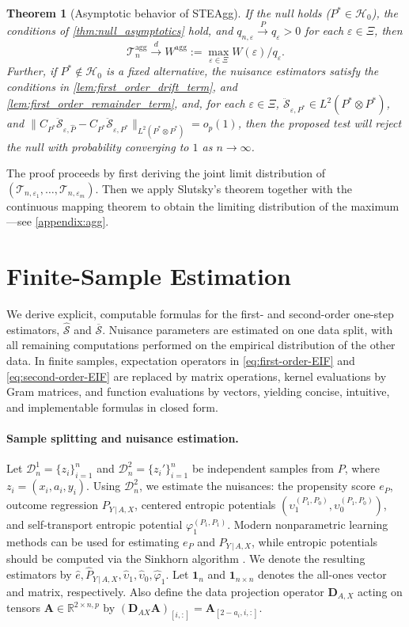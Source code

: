 \documentclass{article}
\theoremstyle{plain}
\newtheorem{theorem}{Theorem}[section]
\theoremstyle{definition}
\theoremstyle{remark}
\newcommand{\R}{\mathbb{R}}
\newcommand{\bA}{\mathbf{A}}
\newcommand{\bD}{\mathbf{D}}
\newcommand{\ucH}{\mathscr{H}}
\newcommand{\wh}[1]{\widehat{#1}}
\newcommand{\hP}{\widehat{P}}
\newcommand{\1}{\mathbbm{1}}
\newcommand{\STE}{\mathscr{S}}
\newcommand{\eps}{\varepsilon}
\theoremstyle{plain}
\theoremstyle{definition}
\newcommand{\mymid}{\,|\,}
\begin{document}
\begin{theorem}[Asymptotic behavior of STEAgg]
\label{thm:agg_null_distribution}
If the null holds ($P^* \in \ucH_0$), the conditions of \cref{thm:null_asymptotics} hold, and $q_{n,\eps}\xrightarrow{P} q_\eps>0$ for each $\eps\in\Xi$, then
\[
\mathcal T_n^{\mathrm{agg}} \xrightarrow{d} W^{\mathrm{agg}} := \max_{\eps \in \Xi}W(\eps)/q_{\eps}.
\]
Further, if $P^* \notin \ucH_0$ is a fixed alternative, the nuisance estimators satisfy the conditions in \cref{lem:first_order_drift_term}, and \cref{lem:first_order_remainder_term}, and, for each $\eps \in \Xi$, $\ddot{\STE}_{\eps, P^*} \in L^2(P^* \otimes P^*)$, and $\|{C_{P^*} \ddot{\STE}_{\eps, \hP} - C_{P^*} \ddot{\STE}_{\eps, P^*}}\|_{L^2(P^* \otimes P^*)} = o_p(1)$, then the proposed test will reject the null with probability converging to $1$ as $n\to\infty$.
\end{theorem}
The proof proceeds by first deriving the joint limit distribution of $(\mathcal T_{n,\eps_1}, \dots, \mathcal T_{n,\eps_m})$. Then we apply Slutsky’s theorem together with the continuous mapping theorem to obtain the limiting distribution of the maximum---see \cref{appendix:agg}.

\section{Finite-Sample Estimation}\label{sec:finite-sample}

We derive explicit, computable formulas for the first- and second-order one-step estimators, $\wh{\STE}$ and $\overline{\STE}$. Nuisance parameters are estimated on one data split, with all remaining computations performed on the empirical distribution of the other data. In finite samples, expectation operators in \eqref{eq:first-order-EIF} and \eqref{eq:second-order-EIF} are replaced by matrix operations, kernel evaluations by Gram matrices, and function evaluations by vectors, yielding concise, intuitive, and implementable formulas in closed form.

\paragraph{Sample splitting and nuisance estimation.}
Let $\mathcal D_n^1 = \{z_i\}_{i=1}^n$ and $\mathcal D_n^2 = \{z_i'\}_{i=1}^n$ be independent
samples from $P$, where $z_i = (x_i,a_i,y_i)$. Using $\mathcal D_n^2$, we estimate the nuisances: the
propensity score $e_P$, outcome regression $P_{Y\mymid A,X}$, centered entropic
potentials $(\upsilon_1^{(P_1,P_0)},\upsilon_0^{(P_1,P_0)})$, and self-transport entropic potential $\varphi_1^{(P_1, P_1)}$. Modern nonparametric learning methods can be used for estimating $e_P$ and $P_{Y\mymid A,X}$, while entropic potentials should be computed via
the Sinkhorn algorithm \cite{cuturi2013sinkhorn}. We denote the resulting estimators by $\hat{e}, \hP_{Y \mymid A, X}, \hat{\upsilon}_1, \hat{\upsilon}_0, \hat{\varphi}_1$. Let $\mathbf{1}_n$ and $\mathbf{1}_{n \times n}$ denotes the all-ones vector and matrix, respectively. Also define the data projection operator $\bD_{A,X}$ acting on tensors $\bA \in \R^{2 \times n, p}$ by $(\bD_{AX} \bA)_{[i, :]} = \bA_{[2-a_i, i, :]}$. 
\end{document}
